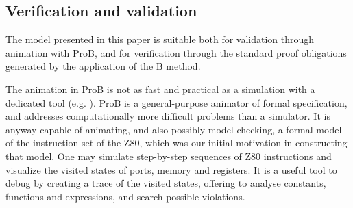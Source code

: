 \documentclass[a4paper]{llncs}
\begin{document}
\subsection{Verification and validation}


The model presented in this paper is suitable both for validation
through animation with ProB, and for verification through the standard
proof obligations generated by the application of the B method.

The animation in ProB is not as fast and practical as a simulation
with a dedicated tool (e.g. \cite{Simulator_z80}). ProB is a
general-purpose animator of formal specification, and addresses
computationally more difficult problems than a simulator. It is anyway
capable of animating, and also possibly model checking, a formal model
of the instruction set of the Z80, which was our initial motivation in
constructing that model. One may simulate step-by-step sequences of
Z80 instructions and visualize the visited states of ports, memory and
registers. It is a useful tool to debug by creating a trace of the
visited states, offering to analyse constants, functions and
expressions, and search possible violations.
%
\end{document}
